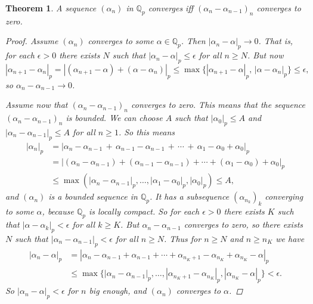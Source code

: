 \documentclass{article}
\newcommand{\QQ}{\mathbb{Q}}
\theoremstyle{myplain}
\newtheorem{theorem}[proposition]{Theorem}
\theoremstyle{mydefinition}
\begin{document}
\begin{theorem}
  A sequence $(\alpha_n)$ in $\QQ_p$ converges iff $(\alpha_n - \alpha_{n-1})_n$
  converges to zero.

  \begin{proof}
    Assume $(\alpha_n)$ converges to some $\alpha \in \QQ_p$. Then
    $|\alpha_n - \alpha|_p \to 0$. That is, for each $\epsilon > 0$ there exists
    $N$ such that $|\alpha_n - \alpha|_p \le \epsilon$ for all $n \ge N$.
    But now
    \[ |\alpha_{n+1} - \alpha_n|_p =
      |(\alpha_{n+1} - \alpha) + (\alpha - \alpha_n)|_p \le
      \max \{ |\alpha_{n+1} - \alpha|_p, \, |\alpha - \alpha_n|_p \} \le \epsilon, \]
    so $\alpha_n - \alpha_{n-1} \to 0$.

    \vspace{1em}

    Assume now that $(\alpha_n - \alpha_{n-1})_n$ converges to zero. This means
    that the sequence $(\alpha_n - \alpha_{n-1})_n$ is bounded. We can choose
    $A$ such that $|\alpha_0|_p \le A$ and $|\alpha_n - \alpha_{n-1}|_p \le A$
    for all $n \ge 1$. So this means
    \begin{align*}
      |\alpha_n|_p & = |\alpha_n - \alpha_{n-1} \,+\, \alpha_{n-1} - \alpha_{n-1} \,+\, \cdots \,+\, \alpha_1 - \alpha_0 + \alpha_0|_p\\
                   & = |(\alpha_n - \alpha_{n-1}) + (\alpha_{n-1} - \alpha_{n-1}) + \cdots + (\alpha_1 - \alpha_0) + \alpha_0|_p\\
                   & \le \max (|\alpha_n - \alpha_{n-1}|_p, \ldots, |\alpha_1 - \alpha_0|_p, |\alpha_0|_p) \le A,
    \end{align*}
    and $(\alpha_n)$ is a bounded sequence in $\QQ_p$. It has a
    subsequence $(\alpha_{n_k})_k$ converging to some $\alpha$, because $\QQ_p$
    is locally compact. So for each $\epsilon > 0$ there exists $K$ such that
    $|\alpha - \alpha_k|_p < \epsilon$ for all $k \ge K$. But
    $\alpha_n - \alpha_{n-1}$ converges to zero, so there exists $N$ such that
    $|\alpha_n - \alpha_{n-1}|_p < \epsilon$ for all $n \ge N$. Thus for
    $n \ge N$ and $n \ge n_K$ we have
    \begin{align*}
      |\alpha_n - \alpha|_p & = |\alpha_n - \alpha_{n-1} + \alpha_{n-1} + \cdots + \alpha_{n_K + 1} - \alpha_{n_K} + \alpha_{n_K} - \alpha|_p\\
                            & \le \max \{ |\alpha_n - \alpha_{n-1}|_p, \ldots, |\alpha_{n_K + 1} - \alpha_{n_K}|_p, |\alpha_{n_K} - \alpha|_p \} < \epsilon.
    \end{align*}
    So $|\alpha_n - \alpha|_p < \epsilon$ for $n$ big enough, and $(\alpha_n)$
    converges to $\alpha$.
  \end{proof}
\end{theorem}
\end{document}
